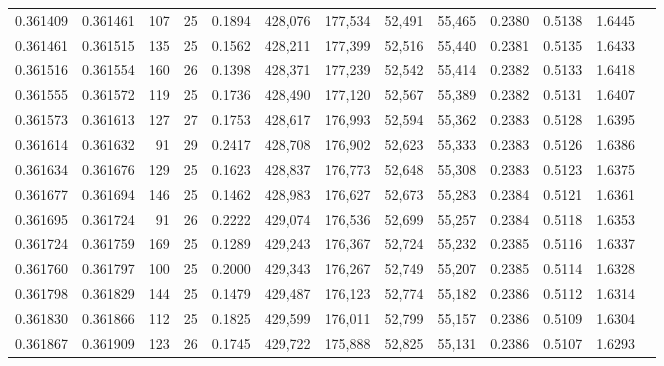 \begin{tabular}{rrrrrrrrrrrrr}
0.361409 & 0.361461 &   107 &  25 &                                     0.1894 & 428,076 & 177,534 &  52,491 &  55,465 & 0.2380 & 0.5138 & 1.6445 \\
0.361461 & 0.361515 &   135 &  25 &                                     0.1562 & 428,211 & 177,399 &  52,516 &  55,440 & 0.2381 & 0.5135 & 1.6433 \\
0.361516 & 0.361554 &   160 &  26 &                                     0.1398 & 428,371 & 177,239 &  52,542 &  55,414 & 0.2382 & 0.5133 & 1.6418 \\
0.361555 & 0.361572 &   119 &  25 &                                     0.1736 & 428,490 & 177,120 &  52,567 &  55,389 & 0.2382 & 0.5131 & 1.6407 \\
0.361573 & 0.361613 &   127 &  27 &                                     0.1753 & 428,617 & 176,993 &  52,594 &  55,362 & 0.2383 & 0.5128 & 1.6395 \\
0.361614 & 0.361632 &    91 &  29 &                                     0.2417 & 428,708 & 176,902 &  52,623 &  55,333 & 0.2383 & 0.5126 & 1.6386 \\
0.361634 & 0.361676 &   129 &  25 &                                     0.1623 & 428,837 & 176,773 &  52,648 &  55,308 & 0.2383 & 0.5123 & 1.6375 \\
0.361677 & 0.361694 &   146 &  25 &                                     0.1462 & 428,983 & 176,627 &  52,673 &  55,283 & 0.2384 & 0.5121 & 1.6361 \\
0.361695 & 0.361724 &    91 &  26 &                                     0.2222 & 429,074 & 176,536 &  52,699 &  55,257 & 0.2384 & 0.5118 & 1.6353 \\
0.361724 & 0.361759 &   169 &  25 &                                     0.1289 & 429,243 & 176,367 &  52,724 &  55,232 & 0.2385 & 0.5116 & 1.6337 \\
0.361760 & 0.361797 &   100 &  25 &                                     0.2000 & 429,343 & 176,267 &  52,749 &  55,207 & 0.2385 & 0.5114 & 1.6328 \\
0.361798 & 0.361829 &   144 &  25 &                                     0.1479 & 429,487 & 176,123 &  52,774 &  55,182 & 0.2386 & 0.5112 & 1.6314 \\
0.361830 & 0.361866 &   112 &  25 &                                     0.1825 & 429,599 & 176,011 &  52,799 &  55,157 & 0.2386 & 0.5109 & 1.6304 \\
0.361867 & 0.361909 &   123 &  26 &                                     0.1745 & 429,722 & 175,888 &  52,825 &  55,131 & 0.2386 & 0.5107 & 1.6293 \\

\end{tabular}
